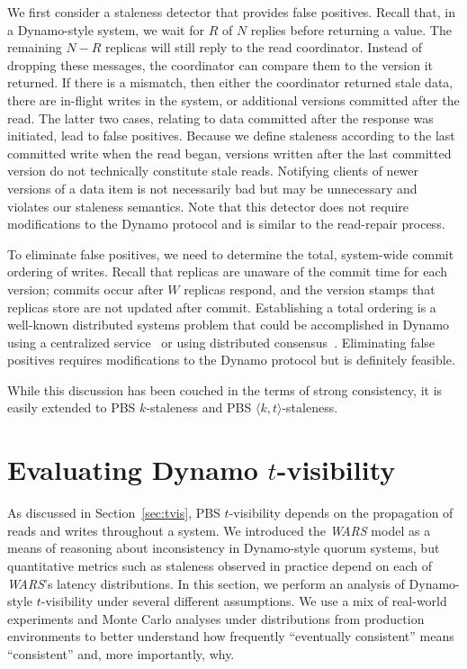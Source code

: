 \documentclass{vldb}
\begin{document}
We first consider a staleness detector that provides false positives.
Recall that, in a Dynamo-style system, we wait for $R$ of $N$ replies
before returning a value.  The remaining $N-R$ replicas will still
reply to the read coordinator.  Instead of dropping these messages,
the coordinator can compare them to the version it returned.  If there
is a mismatch, then either the coordinator returned stale data, there
are in-flight writes in the system, or additional versions committed
after the read. The latter two cases, relating to data committed after
the response was initiated, lead to false positives.  Because we
define staleness according to the last committed write when the read
began, versions written after the last committed version do not
technically constitute stale reads.  Notifying clients of newer
versions of a data item is not necessarily bad but may be unnecessary
and violates our staleness semantics.  Note that this detector does
not require modifications to the Dynamo protocol and is similar to the
read-repair process.

To eliminate false positives, we need to determine the total,
system-wide commit ordering of writes. Recall that replicas are
unaware of the commit time for each version; commits occur after $W$
replicas respond, and the version stamps that replicas store are not
updated after commit.  Establishing a total ordering is a well-known
distributed systems problem that could be accomplished in Dynamo using
a centralized service~\cite{zookeeper} or using distributed
consensus~\cite{paxos}.  Eliminating false positives requires
modifications to the Dynamo protocol but is definitely feasible.

While this discussion has been couched in the terms of strong
consistency, it is easily extended to PBS $k$-staleness and PBS
$\langle k, t \rangle$-staleness.

\section{Evaluating Dynamo $t$-visibility}
\label{sec:dynamoeval}

As discussed in Section~\ref{sec:tvis}, PBS $t$-visibility depends on
the propagation of reads and writes throughout a system.  We
introduced the \textit{WARS}  model as a means of reasoning about
inconsistency in Dynamo-style quorum systems, but quantitative metrics
such as staleness observed in practice depend on each of \textit{WARS}'s
latency distributions.  In this section, we perform an analysis of
Dynamo-style $t$-visibility under several different assumptions.  We
use a mix of real-world experiments and Monte Carlo analyses
under distributions from production environments to better
understand how frequently ``eventually consistent'' means
``consistent'' and, more importantly, why.
\end{document}
